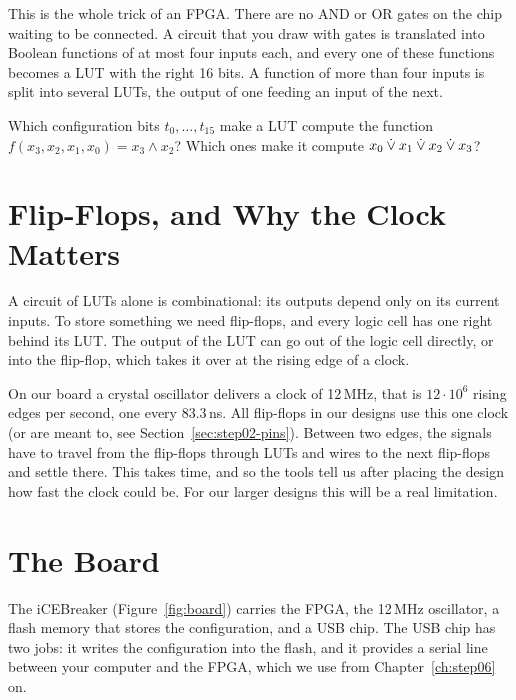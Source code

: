 This is the whole trick of an FPGA. There are no AND or OR gates on the chip
waiting to be connected. A circuit that you draw with gates is translated into
Boolean functions of at most four inputs each, and every one of these functions
becomes a LUT with the right 16 bits. A function of more than four inputs is
split into several LUTs, the output of one feeding an input of the next.

\begin{exercise}
Which configuration bits $t_0, \dots, t_{15}$ make a LUT compute the
function $f(x_3,x_2,x_1,x_0) = x_3 \wedge x_2$? Which ones make it compute
$x_0 \mathbin{\dot{\lor}} x_1 \mathbin{\dot{\lor}} x_2 \mathbin{\dot{\lor}} x_3$?
\end{exercise}

\section{Flip-Flops, and Why the Clock Matters}
\label{sec:ff-intro}

A circuit of LUTs alone is combinational: its outputs depend only on its
current inputs. To store something we need flip-flops, and every logic cell has
one right behind its LUT. The output of the LUT can go out of the logic cell
directly, or into the flip-flop, which takes it over at the rising edge of a
clock.

On our board a crystal oscillator delivers a clock of 12\,MHz, that is
$12 \cdot 10^6$ rising edges per second, one every $83.3$\,ns. All flip-flops
in our designs use this one clock (or are meant to, see
Section~\ref{sec:step02-pins}). Between two edges, the signals have to travel
from the flip-flops through LUTs and wires to the next flip-flops and settle
there. This takes time, and so the tools tell us after placing the design how
fast the clock could be. For our larger designs this will be a real
limitation.

\section{The Board}
\label{sec:board}

The iCEBreaker (Figure~\ref{fig:board}) carries the FPGA, the 12\,MHz
oscillator, a flash memory that stores the configuration, and a USB chip. The
USB chip has two jobs: it writes the configuration into the flash, and it
provides a serial line between your computer and the FPGA, which we use from
Chapter~\ref{ch:step06} on.


